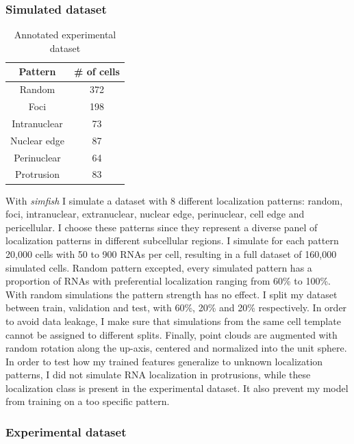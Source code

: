 \subsubsection{Simulated dataset}

\begin{table}
	\centering
	\begin{tabular}{| c | c |}
		\hline
		Pattern & \# of cells \\
		\hline
		Random & 372\\
		Foci & 198\\
		Intranuclear & 73\\
		Nuclear edge & 87\\
		Perinuclear & 64\\
		Protrusion & 83\\
		\hline
	\end{tabular}
	\caption[Annotated experimental dataset for RNA localization patterns]{Annotated experimental dataset}
	\label{table:real_dataset}
\end{table}

With \emph{simfish} I simulate a dataset with 8 different localization patterns: random, foci, intranuclear, extranuclear, nuclear edge, perinuclear, cell edge and pericellular.
I choose these patterns since they represent a diverse panel of localization patterns in different subcellular regions.
I simulate for each pattern 20,000 cells with 50 to 900 \ac{RNA}s per cell, resulting in a full dataset of 160,000 simulated cells.
Random pattern excepted, every simulated pattern has a proportion of \ac{RNA}s with preferential localization ranging from 60\% to 100\%.
With random simulations the pattern strength has no effect.
I split my dataset between train, validation and test, with 60\%, 20\% and 20\% respectively.
In order to avoid data leakage, I make sure that simulations from the same cell template cannot be assigned to different splits.
Finally, point clouds are augmented with random rotation along the up-axis, centered and normalized into the unit sphere.
In order to test how my trained features generalize to unknown localization patterns, I did not simulate \ac{RNA} localization in protrusions, while these localization class is present in the experimental dataset.
It also prevent my model from training on a too specific pattern.

\subsubsection{Experimental dataset}


